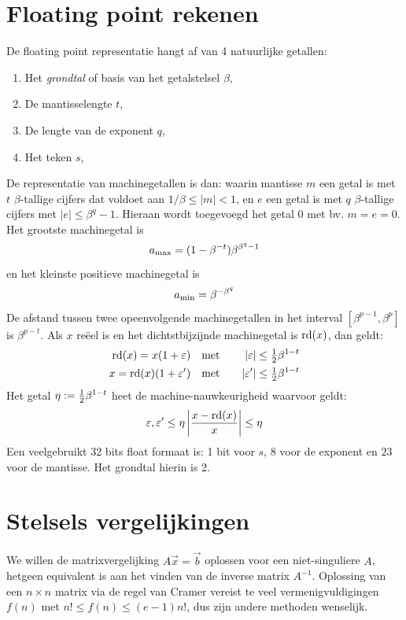 \documentclass[twoside]{report}
\begin{document}
\section{Floating point rekenen}
De floating point representatie hangt af van 4 natuurlijke getallen:
\begin{enumerate}
\item Het {\it grondtal} of basis van het getalstelsel $\beta$,
\item De mantisselengte $t$,
\item De lengte van de exponent $q$,
\item Het teken $s$,
\end{enumerate}
De representatie van machinegetallen is dan: 
waarin mantisse $m$ een getal is met $t$ $\beta$-tallige cijfers dat voldoet
aan $1/\beta\leq|m|<1$, en $e$ een getal is met $q$ $\beta$-tallige cijfers
met $|e|\leq\beta^q-1$. Hieraan wordt toegevoegd het getal 0 met bv. $m=e=0$.
Het grootste machinegetal is
\[
a_{\rm max}=(1-\beta^{-t})\beta^{\beta^q-1}
\]
en het kleinste positieve machinegetal is
\[
a_{\rm min}=\beta^{-\beta^q}
\]
De afstand tussen twee opeenvolgende machinegetallen in het interval
$[\beta^{p-1},\beta^p]$ is $\beta^{p-t}$. Als $x$ re\"eel is en het
dichtstbijzijnde machinegetal is ${\rm rd}(x)$, dan geldt:
\begin{eqnarray*}
{\rm rd}(x)=x(1+\varepsilon) &~~~\mbox{met}~~~&|\varepsilon|\leq\mbox{$\frac{1}{2}$}\beta^{1-t}\\
x={\rm rd}(x)(1+\varepsilon')&~~~\mbox{met}~~~&|\varepsilon'|\leq\mbox{$\frac{1}{2}$}\beta^{1-t}
\end{eqnarray*}
Het getal $\eta:=\mbox{$\frac{1}{2}$}\beta^{1-t}$ heet de machine-nauwkeurigheid waarvoor geldt:
\[
\varepsilon,\varepsilon'\leq\eta\left|\frac{x-{\rm rd}(x)}{x}\right|\leq\eta
\]
Een veelgebruikt 32 bits float formaat is: 1 bit voor $s$, 8 voor de exponent
en $23$ voor de mantisse. Het grondtal hierin is 2.

\section{Stelsels vergelijkingen}
We willen de matrixvergelijking $A\vec{x}=\vec{b}$ oplossen voor een
niet-singuliere $A$, hetgeen equivalent is aan het vinden van de inverse matrix
$A^{-1}$. Oplossing van een $n\times n$ matrix via de regel van Cramer vereist
te veel vermenigvuldigingen $f(n)$ met $n!\leq f(n)\leq (e-1)n!$, dus zijn
andere methoden wenselijk.
\end{document}
